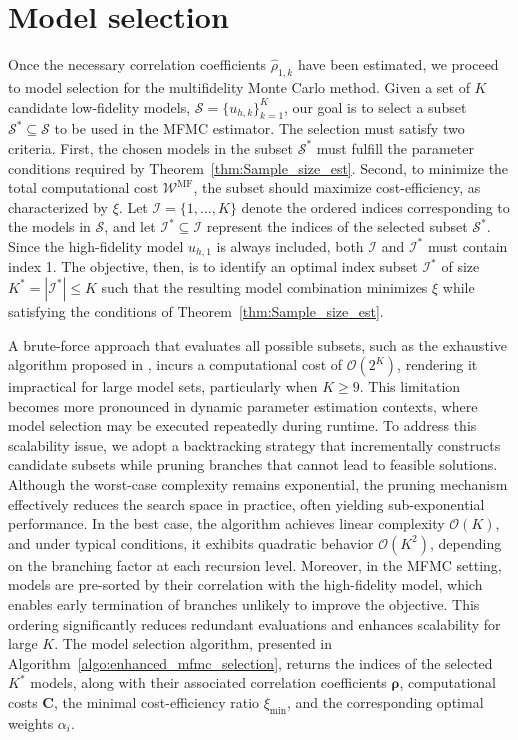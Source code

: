 \section{Model selection}\label{sec:Model_Selection}
Once the necessary correlation coefficients $\widehat \rho_{1,k}$ have been estimated, we proceed to model selection \cite{PeWiGu:2016} for the multifidelity Monte Carlo method. Given a set of $K$ candidate low-fidelity models, $\mathcal{S}=\{ u_{h, k}\}_{k=1}^K$, our goal is to select a subset $\mathcal{S}^* \subseteq \mathcal{S}$ to be used in the MFMC estimator. The selection must satisfy two criteria. First, the chosen models in the subset $\mathcal{S}^*$ must fulfill the parameter conditions required by Theorem~\ref{thm:Sample_size_est}. Second, to minimize the total computational cost $\mathcal{W}^{\text{MF}}$, the subset should maximize cost-efficiency, as characterized by $\xi$. Let $\mathcal{I} = \{1,\ldots,K\}$ denote the ordered indices corresponding to the models in $\mathcal{S}$, and let $\mathcal{I}^*\subseteq \mathcal{I}$ represent the indices of the selected subset $\mathcal{S}^*$. Since the high-fidelity model $u_{h,1}$ is always included, both $\mathcal{I}$ and $\mathcal{I}^*$ must contain index 1. The objective, then, is to identify an optimal index subset $\mathcal{I}^*$ of size $K^* = |\mathcal{I}^*| \leq K$ such that the resulting model combination minimizes $\xi$ while satisfying the conditions of Theorem~\ref{thm:Sample_size_est}.


A brute-force approach that evaluates all possible subsets, such as the exhaustive algorithm proposed in \cite{PeWiGu:2016}, incurs a computational cost of $\mathcal{O}(2^K)$, rendering it impractical for large model sets, particularly when $K \geq 9$. This limitation becomes more pronounced in dynamic parameter estimation contexts, where model selection may be executed repeatedly during runtime. To address this scalability issue, we adopt a backtracking strategy that incrementally constructs candidate subsets while pruning branches that cannot lead to feasible solutions. Although the worst-case complexity remains exponential, the pruning mechanism effectively reduces the search space in practice, often yielding sub-exponential performance. In the best case, the algorithm achieves linear complexity $\mathcal{O}(K)$, and under typical conditions, it exhibits quadratic behavior $\mathcal{O}(K^2)$, depending on the branching factor at each recursion level. Moreover, in the MFMC setting, models are pre-sorted by their correlation with the high-fidelity model, which enables early termination of branches unlikely to improve the objective. This ordering significantly reduces redundant evaluations and enhances scalability for large $K$. The model selection algorithm, presented in Algorithm~\ref{algo:enhanced_mfmc_selection}, returns the indices of the selected $K^*$ models, along with their associated correlation coefficients $\boldsymbol{\rho}$, computational costs $\boldsymbol{C}$, the minimal cost-efficiency ratio $\xi_{\text{min}}$, and the corresponding optimal weights $\alpha_i$.




